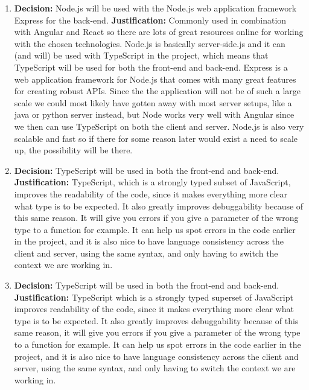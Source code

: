\documentclass{article}
\begin{document}
\begin{enumerate}
    \item \textbf{Decision:} Node.js will be used with the Node.js web application framework Express for the back-end.
    \linebreak{}
    \textbf{Justification:} Commonly used in combination with Angular and React so there are lots of great resources online for working with the chosen technologies. Node.js is basically server-side.js and it can (and will) be used with TypeScript in the project, which means that TypeScript will be used for both the front-end and back-end. Express is a web application framework for Node.js that comes with many great features for creating robust APIs. Since the the application will not be of such a large scale we could most likely have gotten away with most server setups, like a java or python server instead, but Node works very well with Angular since we then can use TypeScript on both the client and server. Node.js is also very scalable and fast so if there for some reason later would exist a need to scale up, the possibility will be there. 
    
     \item \textbf{Decision:} TypeScript will be used in both the front-end and back-end.
    \linebreak{}
    \textbf{Justification:} TypeScript, which is a strongly typed subset of JavaScript, improves the readability of the code, since it makes everything more clear what type is to be expected. It also greatly improves debuggability because of this same reason. It will give you errors if you give a parameter of the wrong type to a function for example. It can help us spot errors in the code earlier in the project, and it is also nice to have language consistency across the client and server, using the same syntax, and only having to switch the context we are working in. 
    
     \item \textbf{Decision:} TypeScript will be used in both the front-end and back-end.
    \linebreak{}
    \textbf{Justification:} TypeScript which is a strongly typed superset of JavaScript improves readability of the code, since it makes everything more clear what type is to be expected. It also greatly improves debuggability because of this same reason, it will give you errors if you give a parameter of the wrong type to a function for example. It can help us spot errors in the code earlier in the project, and it is also nice to have language consistency across the client and server, using the same syntax, and only having to switch the context we are working in. 
    

\end{enumerate}
\end{document}
